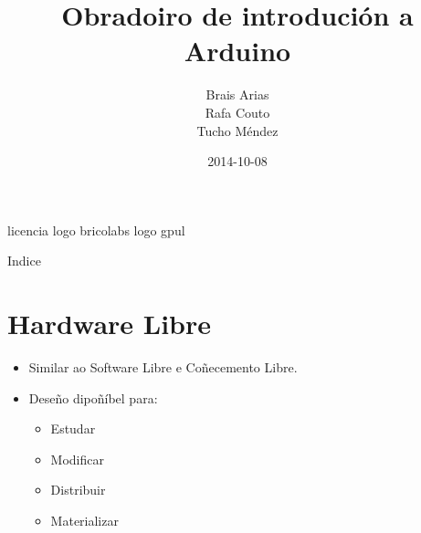 \documentclass{beamer}
\title{Obradoiro de introdución a Arduino}
\author[Brais, Rafa, Tucho]{ Brais Arias \\ Rafa Couto \\ Tucho Méndez}
\date{2014-10-08}
\begin{document}
\begin{frame}
\titlepage

licencia
logo bricolabs
logo gpul
\end{frame}

\begin{frame}{Indice}
  \tableofcontents
\end{frame}

\section{Hardware Libre}
\begin{frame}
\huge{\centerline{\textbf{\color{blue} \insertsection}}}
\end{frame}

\begin{frame}
\begin{itemize}
\item Similar ao Software Libre e Coñecemento Libre.
\item Deseño dipoñíbel para:
\begin{itemize}
 \item Estudar
 \item Modificar
 \item Distribuir
 \item Materializar
\end{itemize}
\end{itemize}
\end{frame}
\end{document}
